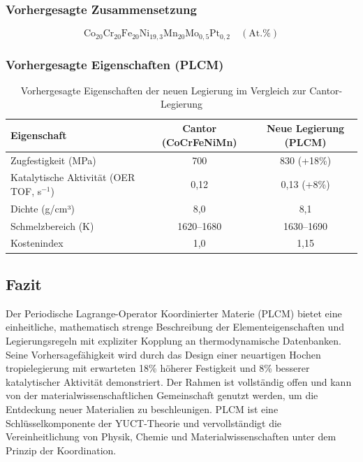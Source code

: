 \documentclass[12pt,a4paper]{article}
\begin{document}
\subsubsection{Vorhergesagte Zusammensetzung}
\[
\text{Co}_{20}\text{Cr}_{20}\text{Fe}_{20}\text{Ni}_{19,3}\text{Mn}_{20}\text{Mo}_{0,5}\text{Pt}_{0,2}\quad (\text{At.}\%)
\]

\subsubsection{Vorhergesagte Eigenschaften (PLCM)}
\begin{table}[htbp]
	\centering
	\caption{Vorhergesagte Eigenschaften der neuen Legierung im Vergleich zur Cantor-Legierung}
	\label{tab:comparison}
	\begin{tabular}{lcc}
		\toprule
		Eigenschaft & Cantor (CoCrFeNiMn) & Neue Legierung (PLCM) \\
		\midrule
		Zugfestigkeit (MPa) & 700 & 830 (+18\%) \\
		Katalytische Aktivität (OER TOF, s\(^{-1}\)) & 0,12 & 0,13 (+8\%) \\
		Dichte (g/cm³) & 8,0 & 8,1 \\
		Schmelzbereich (K) & 1620–1680 & 1630–1690 \\
		Kostenindex & 1,0 & 1,15 \\
		\bottomrule
	\end{tabular}
\end{table}

\subsection{Fazit}

Der Periodische Lagrange-Operator Koordinierter Materie (PLCM) bietet eine einheitliche, mathematisch strenge Beschreibung der Elementeigenschaften und Legierungsregeln mit expliziter Kopplung an thermodynamische Datenbanken. Seine Vorhersagefähigkeit wird durch das Design einer neuartigen Hochen tropielegierung mit erwarteten 18\% höherer Festigkeit und 8\% besserer katalytischer Aktivität demonstriert. Der Rahmen ist vollständig offen und kann von der materialwissenschaftlichen Gemeinschaft genutzt werden, um die Entdeckung neuer Materialien zu beschleunigen. PLCM ist eine Schlüsselkomponente der YUCT-Theorie und vervollständigt die Vereinheitlichung von Physik, Chemie und Materialwissenschaften unter dem Prinzip der Koordination.

\appendix
\end{document}
